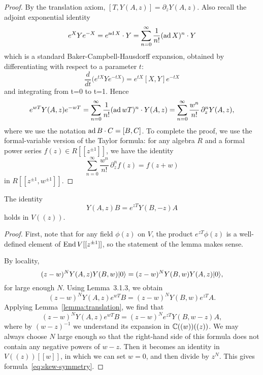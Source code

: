\documentclass[12pt]{article}
\begin{document}
\begin{proof}
    By the translation axiom, $[T,Y(A,z)] = \partial_z Y(A,z)$. Also recall the adjoint exponential identity \begin{align*}
        e^{X}Ye^{-X} = e^{\operatorname{ad} X} \cdot Y = \sum_{n=0}^\infty \frac{1}{n!} (\operatorname{ad} X)^n \cdot Y
    \end{align*} which is a standard Baker-Campbell-Hausdorff expansion, obtained by differentiating with respect to a parameter $t$:
    \[\frac{d}{dt}\big(e^{tX} Y e^{-tX}\big) = e^{tX}[X,Y]e^{-tX}\]
    and integrating from t=0 to t=1.
    Hence
    \[
        e^{wT} Y(A,z) e^{-wT}
        = \sum_{n=0}^\infty \frac{1}{n!} (\operatorname{ad} wT)^n \cdot Y(A,z)
        = \sum_{n=0}^\infty \frac{w^n}{n!}\,\partial_z^n Y(A,z),
    \]
    where we use the notation $\operatorname{ad} B \cdot C = [B,C]$.
    To complete the proof, we use the formal-variable version of the Taylor formula:
    for any algebra $R$ and a formal power series $f(z) \in R[[z^{\pm1}]]$, we have the identity
    \[
        \sum_{n=0}^\infty \frac{w^n}{n!}\,\partial_z^n f(z) = f(z+w)
    \]
    in $R[[z^{\pm1},w^{\pm1}]]$.
\end{proof}

\begin{proposition}
    \label{prop:skew-symmetry}
    The identity
    \begin{equation}
        \label{eq:skew-symmetry}
        Y(A,z)B = e^{zT} Y(B,-z)A
    \end{equation}
    holds in $V((z))$.
\end{proposition}

\begin{proof}
    First, note that for any field $\phi(z)$ on $V$, the product $e^{zT}\phi(z)$ is a well-defined element of $\operatorname{End} V[[z^{\pm1}]]$, so the statement of the lemma makes sense.

    By locality,
    \[
        (z-w)^N Y(A,z)Y(B,w)\lvert 0 \rangle = (z-w)^N Y(B,w)Y(A,z)\lvert 0 \rangle,
    \]
    for large enough $N$. Using Lemma~3.1.3, we obtain
    \[
        (z-w)^N Y(A,z) e^{wT} B = (z-w)^N Y(B,w) e^{zT} A.
    \]
    Applying Lemma~\ref{lemma:translation}, we find that
    \[
        (z-w)^N Y(A,z)e^{wT}B = (z-w)^N e^{zT} Y(B,w-z)A,
    \]
    where by $(w-z)^{-1}$ we understand its expansion in $\mathbb{C}((w))((z))$.
    We may always choose $N$ large enough so that the right-hand side
    of this formula does not contain any negative powers of $w-z$.
    Then it becomes an identity in $V((z))[[w]]$, in which we can set $w=0$,
    and then divide by $z^N$. This gives formula~\eqref{eq:skew-symmetry}.
\end{proof}
\end{document}
